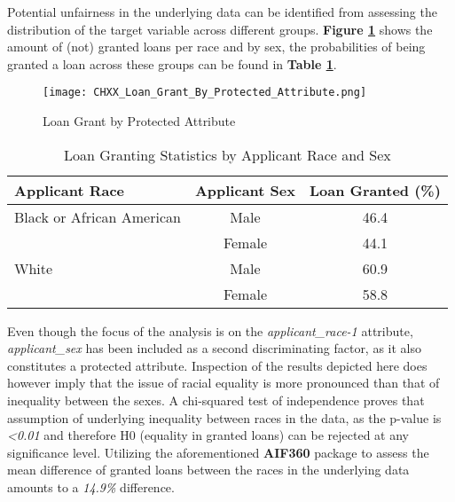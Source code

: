 

Potential unfairness in the underlying data can be identified from assessing the distribution of the target variable across different groups.
\textbf{Figure \ref{fig:CHXX_Loan_Grant_By_Protected_Attribute}} shows the amount of (not) granted loans per race and by sex, the probabilities of being granted a loan across these groups can be found in \textbf{Table \ref{tab:loan_granting}}.\@

\begin{figure}[h]
    \centering
    \texttt{[image: CHXX\_Loan\_Grant\_By\_Protected\_Attribute.png]}
    \caption{Loan Grant by Protected Attribute}
    \label{fig:CHXX_Loan_Grant_By_Protected_Attribute}
\end{figure}

\begin{table}[htbp]
    \centering
      \begin{tabular}{lcc}
      \toprule
      \textbf{Applicant Race} & \textbf{Applicant Sex} & \textbf{Loan Granted (\%)} \\
      \midrule
      Black or African American & Male    & 46.4 \\
            & Female  & 44.1 \\
      White & Male    & 60.9 \\
            & Female  & 58.8 \\
      \bottomrule
      \end{tabular}%
      \caption{Loan Granting Statistics by Applicant Race and Sex}
    \label{tab:loan_granting}%
\end{table}%

Even though the focus of the analysis is on the \textit{applicant\_race-1} attribute, \textit{applicant\_sex} has been included as a second discriminating factor, as it also constitutes a protected attribute.
Inspection of the results depicted here does however imply that the issue of racial equality is more pronounced than that of inequality between the sexes.
A chi-squared test of independence proves that assumption of underlying inequality between races in the data, as the p-value is \textit{<0.01} and therefore H0 (equality in granted loans) can be rejected at any significance level.
Utilizing the aforementioned \textbf{AIF360} package to assess the mean difference of granted loans between the races in the underlying data amounts to a \textit{14.9\%} difference.

